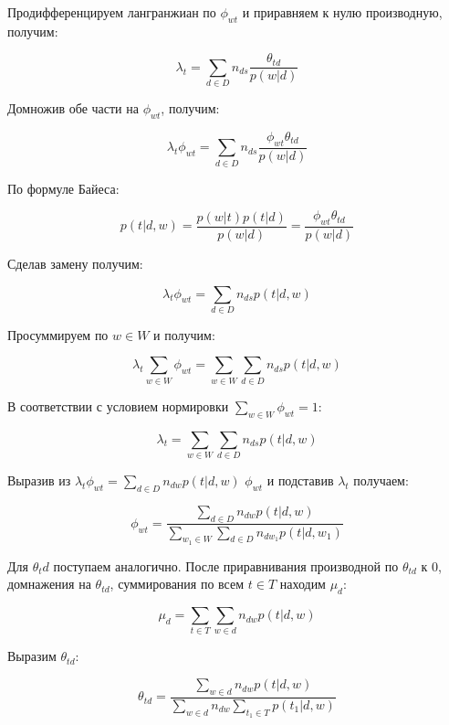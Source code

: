 Продифференцируем лангранжиан по $\phi_{wt}$ и приравняем к нулю производную, получим:

$$\lambda_{t} = \sum_{d \in D} n_{ds} \frac{\theta_{td}}{p(w|d)}$$

Домножив обе части на $\phi_{wt}$, получим:

$$\lambda_{t} \phi_{wt} = \sum_{d \in D} n_{ds} \frac{\phi_{wt} \theta_{td}}{p(w|d)}$$

По формуле Байеса:

$$p(t|d,w) = \frac{p(w|t) p(t|d)}{p(w|d)} = \frac{\phi_{wt} \theta_{td}}{p(w|d)}$$

Сделав замену  получим:

$$\lambda_{t} \phi_{wt} = \sum_{d \in D} n_{ds} p(t|d,w)$$

Просуммируем по $w \in W$ и получим:

$$\lambda_{t} \sum_{w \in W} \phi_{wt} = \sum_{w \in W} \sum_{d \in D} n_{ds} p(t|d,w)$$

В соответствии с условием нормировки $\sum_{w \in W} \phi_{wt} = 1$:

$$\lambda_{t} = \sum_{w \in W} \sum_{d \in D} n_{ds} p(t|d,w)$$

Выразив из $\lambda_t \phi_{wt} = \sum_{d \in D} n_{dw} p(t|d,w)$ $\phi_{wt}$ и подставив $\lambda_{t}$ получаем:

$$\phi_{wt} = \frac{\sum_{d \in D} n_{dw} p(t|d,w)}{\sum_{w_{1} \in W} \sum_{d \in D} n_{dw_{1}} p(t|d,w_{1})}$$

Для $\theta_td$ поступаем аналогично. После приравнивания производной по $\theta_{td}$ к $0$, домнажения на $\theta_{td}$, суммирования по всем $t \in T$ находим $\mu_{d}$:

$$\mu_{d} = \sum_{t \in T} \sum_{w \in d} n_{dw} p(t|d,w)$$

Выразим $\theta_{td}$:

$$\theta_{td} = \frac{\sum_{w \in d} n_{dw} p(t|d,w)}{\sum_{w \in d} n_{dw} \sum_{t_{1} \in T} p(t_{1}|d,w)}$$
